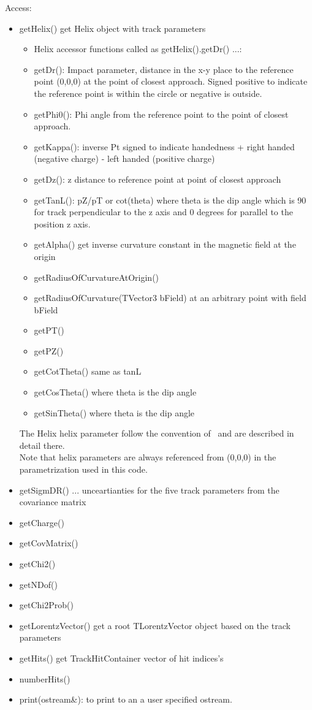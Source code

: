 \documentclass[aps,prd,superscriptaddress,floatfix]{revtex4}
\begin{document}
Access:
\begin{itemize}
\item getHelix() get Helix object with track parameters
\begin{itemize}
\item Helix accessor functions called as getHelix().getDr() ...:
\item getDr(): Impact parameter, distance in the x-y place to the reference point (0,0,0) at the point of closest
approach. Signed positive to indicate the reference point is within the circle or negative is outside.
\item getPhi0(): Phi angle from the reference point to the point of closest approach.
\item getKappa(): inverse Pt signed to indicate handedness + right handed (negative charge) - left handed
(positive charge)
\item getDz(): z distance to reference point at point of closest approach
\item getTanL(): pZ/pT or cot(theta) where theta is the dip angle which is 90 for track perpendicular
to the z axis and 0 degrees for parallel to the position z axis.
\item getAlpha() get inverse curvature constant in the magnetic field at the origin
\item getRadiusOfCurvatureAtOrigin()
\item getRadiusOfCurvature(TVector3 bField) at an arbitrary point with field bField
\item getPT()
\item getPZ()
\item getCotTheta() same as tanL
\item getCosTheta() where theta is the dip angle
\item getSinTheta() where theta is the dip angle 
\end{itemize}
The Helix helix parameter follow the convention of~\cite{helix} and are described in detail there.\\
Note that helix parameters are always referenced from (0,0,0) in the parametrization used in this code.
\item getSigmDR() ... unceartianties for the five track parameters from the covariance matrix
\item getCharge()
\item getCovMatrix()
\item getChi2()
\item getNDof()
\item getChi2Prob()
\item getLorentzVector() get a root TLorentzVector object based on the track parameters
\item getHits() get TrackHitContainer vector of hit indices's
\item numberHits()
\item print(ostream\&): to print to an a user specified ostream.

\end{itemize}
\end{document}
